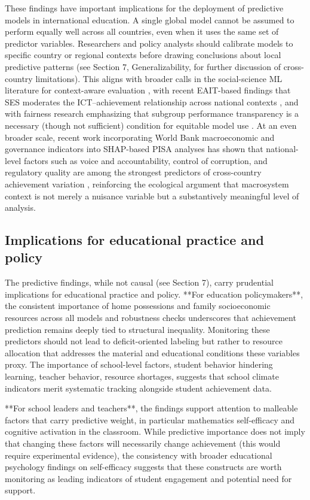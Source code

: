 \documentclass[pdflatex,sn-mathphys-ay]{sn-jnl}
\begin{document}
These findings have important implications for the deployment of predictive models in international education. A single global model cannot be assumed to perform equally well across all countries, even when it uses the same set of predictor variables. Researchers and policy analysts should calibrate models to specific country or regional contexts before drawing conclusions about local predictive patterns (see Section 7, Generalizability, for further discussion of cross-country limitations). This aligns with broader calls in the social-science ML literature for context-aware evaluation \citep{Sahoo_2024}, with recent EAIT-based findings that SES moderates the ICT–achievement relationship across national contexts \citep{KC_2025_digital_inequality}, and with fairness research emphasizing that subgroup performance transparency is a necessary (though not sufficient) condition for equitable model use \citep{Li_2025,Kizilcec_Lee_2022}. At an even broader scale, recent work incorporating World Bank macroeconomic and governance indicators into SHAP-based PISA analyses has shown that national-level factors such as voice and accountability, control of corruption, and regulatory quality are among the strongest predictors of cross-country achievement variation \citep{Kisman_2026}, reinforcing the ecological argument that macrosystem context is not merely a nuisance variable but a substantively meaningful level of analysis.

\FloatBarrier
\subsection{Implications for educational practice and policy}

The predictive findings, while not causal (see Section 7), carry prudential implications for educational practice and policy. **For education policymakers**, the consistent importance of home possessions and family socioeconomic resources across all models and robustness checks underscores that achievement prediction remains deeply tied to structural inequality. Monitoring these predictors should not lead to deficit-oriented labeling but rather to resource allocation that addresses the material and educational conditions these variables proxy. The importance of school-level factors, student behavior hindering learning, teacher behavior, resource shortages, suggests that school climate indicators merit systematic tracking alongside student achievement data.

**For school leaders and teachers**, the findings support attention to malleable factors that carry predictive weight, in particular mathematics self-efficacy and cognitive activation in the classroom. While predictive importance does not imply that changing these factors will necessarily change achievement (this would require experimental evidence), the consistency with broader educational psychology findings on self-efficacy \citep{Bandura_1997_self_efficacy} suggests that these constructs are worth monitoring as leading indicators of student engagement and potential need for support.
\end{document}

